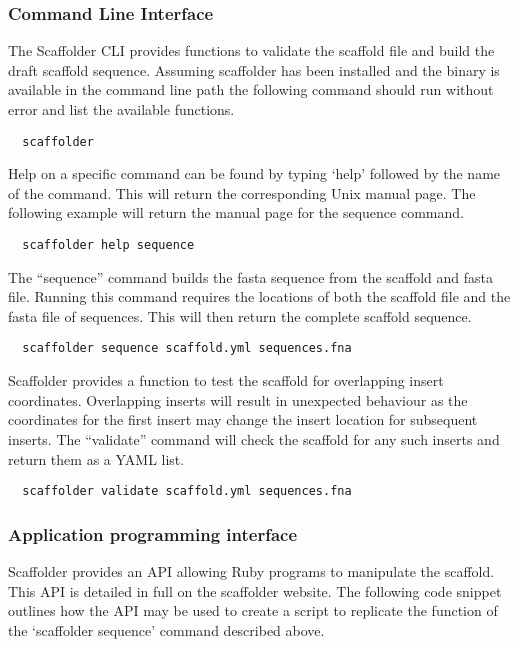 \documentclass[10pt]{bmc_article}
\newenvironment{bmcformat}{\begin{raggedright}\baselineskip20pt\sloppy\setboolean{publ}{false}}{\end{raggedright}\baselineskip20pt\sloppy}
\begin{document}
\begin{bmcformat}
\subsubsection*{Command Line Interface} %

The Scaffolder CLI provides functions to validate the scaffold file and build the draft scaffold sequence. Assuming scaffolder has been installed and the
binary is available in the command line path the following command should run without error and list the available functions. \pb

\begin{verbatim}
  scaffolder
\end{verbatim}

Help on a specific command can be found by typing `help' followed by the name
of the command. This will return the corresponding Unix manual page. The
following example will return the manual page for the sequence command. \pb

\begin{verbatim}
  scaffolder help sequence
\end{verbatim} 

The ``sequence'' command builds the fasta sequence from the scaffold and fasta
file. Running this command requires the locations of both the scaffold file and
the fasta file of sequences. This will then return the complete scaffold
sequence. \pb

\begin{verbatim}
  scaffolder sequence scaffold.yml sequences.fna
\end{verbatim}

Scaffolder provides a function to test the scaffold for overlapping insert
coordinates. Overlapping inserts will result in unexpected behaviour as the
coordinates for the first insert may change the insert location for subsequent
inserts. The ``validate'' command will check the scaffold for any such inserts
and return them as a YAML list. \pb

\begin{verbatim}
  scaffolder validate scaffold.yml sequences.fna
\end{verbatim}

\subsubsection*{Application programming interface} %

Scaffolder provides an API allowing Ruby programs to manipulate the scaffold.
This API is detailed in full on the scaffolder website. The following code
snippet outlines how the API may be used to create a script to replicate the
function of the `scaffolder sequence' command described above. \pb


\end{bmcformat}
\end{document}
